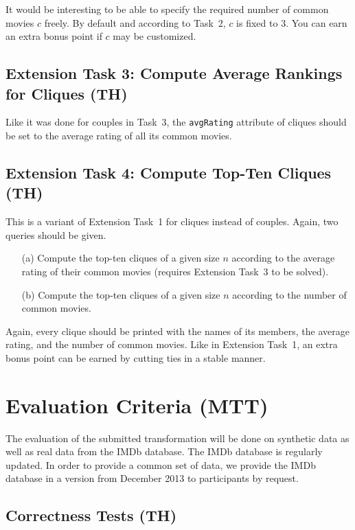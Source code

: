 \documentclass[a4paper,11pt]{article}
\begin{document}
It would be interesting to be able to specify the required number of common
movies \(c\) freely.  By default and according to Task~2, \(c\) is fixed to 3.
You can earn an extra bonus point if \(c\) may be customized.


\subsection{Extension Task 3: Compute Average Rankings for Cliques (TH)}

Like it was done for couples in Task~3, the \verb|avgRating| attribute of
cliques should be set to the average rating of all its common movies.

\subsection{Extension Task 4: Compute Top-Ten Cliques (TH)}

This is a variant of Extension Task~1 for cliques instead of couples.  Again,
two queries should be given.

\begin{enumerate}
\item[(a)] Compute the top-ten cliques of a given size \(n\) according to the
  average rating of their common movies (requires Extension Task~3 to be
  solved).
\item[(b)] Compute the top-ten cliques of a given size \(n\) according to the
  number of common movies.
\end{enumerate}

Again, every clique should be printed with the names of its members, the
average rating, and the number of common movies.  Like in Extension Task~1, an
extra bonus point can be earned by cutting ties in a stable manner.


\section{Evaluation Criteria (MTT)}\label{sec-eval}

The evaluation of the submitted transformation will be done on
synthetic data as well as real data from the IMDb database. The IMDb
database is regularly updated. In order to provide a common set of
data, we provide the IMDb database in a version from December 2013 to
participants by request. 

\subsection{Correctness Tests (TH)}
\end{document}
